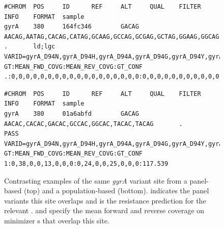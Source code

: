 \begin{figure}
\begin{Verbatim}[breaklines=true,breakanywhere=true,frame=single,framerule=0.5mm,fontsize=\footnotesize,label=\textit{gyrA} mutation S95T VCF entry for panel-based \prg{}]
#CHROM  POS     ID      REF     ALT     QUAL    FILTER  INFO    FORMAT  sample
gyrA    380     164fc346        GACAG     AACAG,AATAG,CACAG,CATAG,GCAAG,GCCAG,GCGAG,GCTAG,GGAAG,GGCAG,GGGAG,GGTAG,TACAG,TATAG,TGCAG,TGTAG,GACAC .       ld;lgc  VARID=gyrA_D94N,gyrA_D94H,gyrA_D94A,gyrA_D94G,gyrA_D94Y,gyrA_D94C,gyrA_S95T;PREDICT=S,S,S,S,S,S,S  GT:MEAN_FWD_COVG:MEAN_REV_COVG:GT_CONF     .:0,0,0,0,0,0,0,0,0,0,0,0,0,0,0,0,0,0:0,0,0,0,0,0,0,0,0,0,0,0,0,0,0,0,0,0:0
\end{Verbatim}
\begin{Verbatim}[breaklines=true,breakanywhere=true,frame=single,framerule=0.5mm,fontsize=\footnotesize,label=\textit{gyrA} mutation S95T VCF entry for population-based \prg{}]
#CHROM  POS     ID      REF     ALT     QUAL    FILTER  INFO    FORMAT  sample
gyrA    380     01a6abfd        GACAG   AACAC,CACAC,GACAC,GCCAC,GGCAC,TACAC,TACAG       .       PASS    VARID=gyrA_D94N,gyrA_D94H,gyrA_D94A,gyrA_D94G,gyrA_D94Y,gyrA_D94C,gyrA_S95T;PREDICT=R,S,S,S,S,S,S      GT:MEAN_FWD_COVG:MEAN_REV_COVG:GT_CONF     1:0,38,0,0,13,0,0,0:0,24,0,0,25,0,0,0:117.539
\end{Verbatim}
\caption{Contrasting examples of the same \textit{gyrA} variant site from a panel-based \prg{} (top) and a population-based \prg{} (bottom).  indicates the panel variants this site overlaps and  is the resistance prediction for the relevant .  and  specify the mean forward and reverse \kmer{} coverage on minimizer \kmer{}s that overlap this site.}
\label{fig:example-gyrA-dense}
\end{figure}